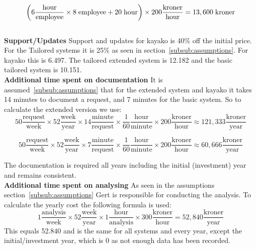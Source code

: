 \[ \left( 6 \frac{\mathrm{hour}}{\mathrm{employee}} \times 8 \hspace{1mm} \mathrm{employee} + 20 \hspace{1mm} \mathrm{hour} \right) \times 200 \frac{\mathrm{kroner}}{\mathrm{hour}} = 13,600 \hspace{1mm} \mathrm{kroner} \]\\

\textbf{Support/Updates}
Support and updates for kayako is 40\% off the initial price. For the Tailored systems it is 25\% as seen in section~\ref{subsub:assumptions}. For kayako this is 6.497. The tailored extended system is 12.182 and the basic tailored system is 10.151.\\

\textbf{Additional time spent on documentation}
It is assumed~\ref{subsub:assumptions} that for the extended system and kayako it takes 14 minutes to document a request, and 7 minutes for the basic system.
So to calculate the extended version we use:
\[ 50 \frac{\mathrm{request}}{\mathrm{week}} \times 52 \frac{\mathrm{week}}{\mathrm{year}} \times 14\frac{\mathrm{minute}}{\mathrm{request}} \times \frac{1}{60} \frac{\mathrm{hour}}{\mathrm{minute}} \times 200\frac{\mathrm{kroner}}{\mathrm{hour}} \approx 121,333 \frac{\mathrm{kroner}}{\mathrm{year}} \]

\[ 50 \frac{\mathrm{request}}{\mathrm{week}} \times 52 \frac{\mathrm{week}}{\mathrm{year}} \times 7\frac{\mathrm{minute}}{\mathrm{request}} \times \frac{1}{60} \frac{\mathrm{hour}}{\mathrm{minute}} \times 200\frac{\mathrm{kroner}}{\mathrm{hour}} \approx 60,666 \frac{\mathrm{kroner}}{\mathrm{year}} \]

The documentation is required all years including the initial (investment) year and remains consistent. \\

\textbf{Additional time spent on analysing}
As seen in the assumptions section~\ref{subsub:assumptions} Gert is responsible for conducting the analysis. To calculate the yearly cost the following formula is used:
\[ 1 \frac{\mathrm{analysis}}{\mathrm{week}} \times 52 \frac{\mathrm{week}}{\mathrm{year}} \times 1 \frac{\mathrm{hour}}{\mathrm{analysis}} \times 300 \frac{\mathrm{kroner}}{\mathrm{hour}} = 52,840 \frac{\mathrm{kroner}}{\mathrm{year}}\]
This equals 52.840 and is the same for all systems and every year, except the initial/investment year, which is 0 as not enough data has been recorded.

